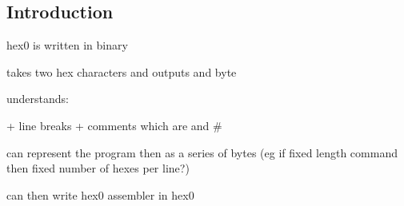 
\subsection{Introduction}

hex0 is written in binary

takes two hex characters and outputs and byte

understands:

+ line breaks
+ comments which are \; and \#

can represent the program then as a series of bytes (eg if fixed length command then fixed number of hexes per line?)

can then write hex0 assembler in hex0

